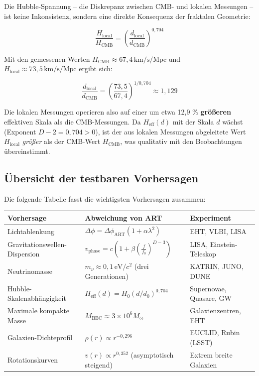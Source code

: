 Die Hubble-Spannung – die Diskrepanz zwischen CMB- und lokalen Messungen – ist keine Inkonsistenz, sondern eine direkte Konsequenz der fraktalen Geometrie:

\[
\frac{H_{\text{local}}}{H_{\text{CMB}}} = \left( \frac{d_{\text{local}}}{d_{\text{CMB}}} \right)^{0,704}
\]

Mit den gemessenen Werten \( H_{\text{CMB}} \approx 67,4 \, \text{km/s/Mpc} \) und \( H_{\text{local}} \approx 73,5 \, \text{km/s/Mpc} \) ergibt sich:

\[
\frac{d_{\text{local}}}{d_{\text{CMB}}} = \left( \frac{73,5}{67,4} \right)^{1/0,704} \approx 1,129
\]

Die lokalen Messungen operieren also auf einer um etwa 12,9 \% \textbf{größeren} effektiven Skala als die CMB-Messungen. Da \( H_{\text{eff}}(d) \) mit der Skala \( d \) wächst (Exponent \( D-2 = 0,704 > 0 \)), ist der aus lokalen Messungen abgeleitete Wert \( H_{\text{local}} \) \textit{größer} als der CMB-Wert \( H_{\text{CMB}} \), was qualitativ mit den Beobachtungen übereinstimmt.

\subsection{Übersicht der testbaren Vorhersagen}
\label{sub:vorh_uebersicht}

Die folgende Tabelle fasst die wichtigsten Vorhersagen zusammen:

\begin{tabular}{|l|l|l|}
\hline
\textbf{Vorhersage} & \textbf{Abweichung von ART} & \textbf{Experiment} \\
\hline
Lichtablenkung & \(\Delta\phi = \Delta\phi_{\text{ART}}(1 + \alpha\lambda^2)\) & EHT, VLBI, LISA \\
Gravitationswellen-Dispersion & \(v_{\text{phase}} = c \left(1 + \beta \left(\frac{f}{f_0}\right)^{D-3}\right)\) & LISA, Einstein-Teleskop \\
Neutrinomasse & \(m_\nu \approx 0,1\,\text{eV}/c^2\) (drei Generationen) & KATRIN, JUNO, DUNE \\
Hubble-Skalenabhängigkeit & \(H_{\text{eff}}(d) = H_0 (d/d_0)^{0,704}\) & Supernovae, Quasare, GW \\
Maximale kompakte Masse & \(M_{\text{BEC}} \approx 3 \times 10^6 M_\odot\) & Galaxienzentren, EHT \\
Galaxien-Dichteprofil & \(\rho(r) \propto r^{-0,296}\) & EUCLID, Rubin (LSST) \\
Rotationskurven & \(v(r) \propto r^{0,352}\) (asymptotisch steigend) & Extrem breite Galaxien \\
\hline
\end{tabular}

